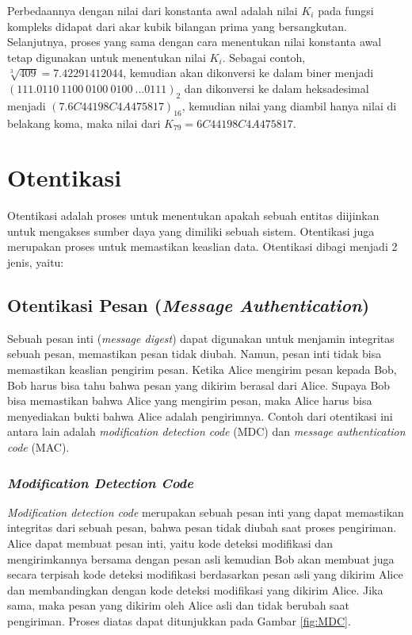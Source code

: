 Perbedaannya dengan nilai dari konstanta awal adalah nilai \begin{math}K_i\end{math} pada fungsi kompleks didapat dari akar kubik bilangan prima yang bersangkutan. Selanjutnya, proses yang sama dengan cara menentukan nilai konstanta awal tetap digunakan untuk menentukan nilai \begin{math}K_i\end{math}. Sebagai contoh, \begin{math}\sqrt[3]{409} = 7.42291412044\end{math}, kemudian akan dikonversi ke dalam biner menjadi \begin{math}(111.0110\: 1100\: 0100\: 0100\: ... 0111)_2\end{math} dan dikonversi ke dalam heksadesimal menjadi \begin{math}(7.6C44198C4A475817)_{16}\end{math}, kemudian nilai yang diambil hanya nilai di belakang koma, maka nilai dari \begin{math}K_{79} = 6C44198C4A475817\end{math}.

\section{Otentikasi}
Otentikasi adalah proses untuk menentukan apakah sebuah entitas diijinkan untuk mengakses sumber daya yang dimiliki sebuah sistem. Otentikasi juga merupakan proses untuk memastikan keaslian data. Otentikasi dibagi menjadi 2 jenis, yaitu:

\subsection{Otentikasi Pesan (\textit{Message Authentication})}
Sebuah pesan inti (\textit{message digest}) dapat digunakan untuk menjamin integritas sebuah pesan, memastikan pesan tidak diubah. Namun, pesan inti tidak bisa memastikan keaslian pengirim pesan. Ketika Alice mengirim pesan kepada Bob, Bob harus bisa tahu bahwa pesan yang dikirim berasal dari Alice. Supaya Bob bisa memastikan bahwa Alice yang mengirim pesan, maka Alice harus bisa menyediakan bukti bahwa Alice adalah pengirimnya. Contoh dari otentikasi ini antara lain adalah \textit{modification detection code} (MDC) dan \textit{message authentication code} (MAC).

\subsubsection{\textit{Modification Detection Code}}
\textit{Modification detection code} merupakan sebuah pesan inti yang dapat memastikan integritas dari sebuah pesan, bahwa pesan tidak diubah saat proses pengiriman. Alice dapat membuat pesan inti, yaitu kode deteksi modifikasi dan mengirimkannya bersama dengan pesan asli kemudian Bob akan membuat juga secara terpisah kode deteksi modifikasi berdasarkan pesan asli yang dikirim Alice dan membandingkan dengan kode deteksi modifikasi yang dikirim Alice. Jika sama, maka pesan yang dikirim oleh Alice asli dan tidak berubah saat pengiriman. Proses diatas dapat ditunjukkan pada Gambar \ref{fig:MDC}.

